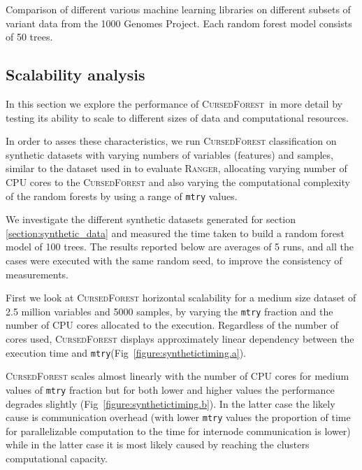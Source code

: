 \documentclass[10pt,letterpaper]{article}
\newcommand{\cursedforest}{\textsc{CursedForest}\xspace}
\newcommand{\ranger}{\textsc{Ranger}\xspace}
\newcommand{\mtry}{\texttt{mtry}\xspace}
\begin{document}
\begin{table}[!ht]
\begin{minipage}{\textwidth}
\begin{tabular}{| l | l | r | l |}
\end{tabular}
\begin{flushleft} 
Comparison of different various machine learning libraries on different subsets of variant data 
from the 1000 Genomes Project.
Each random forest model consists of 50 trees.
\end{flushleft}
\label{timingtable}
\end{minipage}
\end{table}

\fi


\subsection{Scalability analysis}
In this section we explore the performance of \cursedforest\ in more detail by testing its ability to scale to different sizes of data
and computational resources.

In order to asses these characteristics, we run \cursedforest classification on synthetic datasets with varying numbers
of variables (features) and samples, similar to the dataset used in \cite{Wright.and.Ziegle.2016} to evaluate
\ranger, allocating varying number of CPU cores to the \cursedforest and also varying the computational complexity
of the random forests by using a range of \mtry values.

We investigate the different synthetic datasets generated for section \ref{section:synthetic_data} and measured the time
taken to build a random forest model of 100 trees. The results reported below are averages of 5 runs, and all the cases
were executed with the same random seed, to improve the consistency of measurements.

First we look at \cursedforest horizontal scalability for a medium size dataset of 2.5 million variables and 5000
samples, by varying the \mtry  fraction and the number of CPU cores allocated to the execution. 
Regardless of the number of cores used, \cursedforest displays approximately linear dependency between the execution
time and \mtry (Fig~\ref{figure:synthetictiming.a}).

\cursedforest scales almost linearly with the number of CPU cores for medium values of \mtry fraction but for both lower
and higher values the performance degrades slightly (Fig~\ref{figure:synthetictiming.b}). In the latter case the likely
cause is communication overhead (with lower \mtry values the proportion of time for parallelizable computation to the
time for internode communication is lower) while in the latter case it is most likely caused by reaching the clusters
computational capacity.
\end{document}
